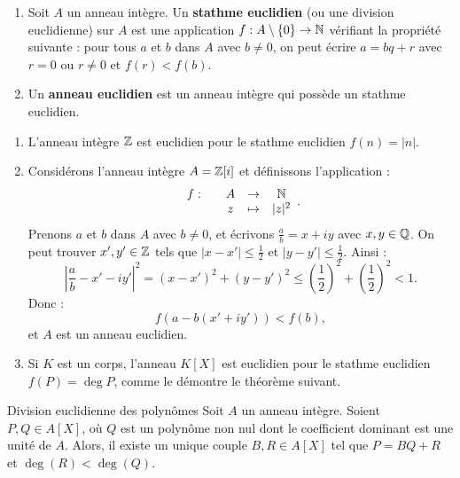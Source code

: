 \documentclass[]{report}
\begin{document}
\begin{df}{}{}
    \begin{enumerate}
        \item Soit $A$ un anneau intègre. Un \textbf{stathme euclidien} (ou une division euclidienne) sur $A$ est une application $f : A \setminus \{0\} \to \mathbb{N}$ vérifiant la propriété suivante : pour tous $a$ et $b$ dans $A$ avec $b \neq 0$, on peut écrire $a = bq + r$ avec $r = 0$ ou $r \neq 0$ et $f(r) < f(b)$.
        \item Un \textbf{anneau euclidien} est un anneau intègre qui possède un stathme euclidien.
    \end{enumerate}
\end{df}

\begin{ex}{}{}
    \begin{enumerate}
        \item L'anneau intègre $\mathbb{Z}$ est euclidien pour le stathme euclidien $f(n) = |n|$.
        \item Considérons l'anneau intègre $A = \mathbb{Z}[i]$ et définissons l'application :
        \[\begin{array}{ccccc} f : & & A & \to & \mathbb{N} \\ & & z & \mapsto & |z|^2 \end{array}.\]
        Prenons $a$ et $b$ dans $A$ avec $b \neq 0$, et écrivons $\frac{a}{b} = x + iy$ avec $x, y \in \mathbb{Q}$. On peut trouver $x', y' \in \mathbb{Z}$ tels que $|x - x'| \le \frac{1}{2}$ et $|y - y'| \le \frac{1}{2}$. Ainsi :
        \[\left| \frac{a}{b} - x' - iy' \right|^2 = (x - x')^2 + (y - y')^2 \le \left(\frac{1}{2}\right)^2 + \left(\frac{1}{2}\right)^2 < 1.\]
        Donc :
        \[f(a - b(x' + iy')) < f(b),\]
        et $A$ est un anneau euclidien.
        \item Si $K$ est un corps, l'anneau $K[X]$ est euclidien pour le stathme euclidien $f(P) = \deg P$, comme le démontre le théorème suivant.
    \end{enumerate}
\end{ex}

\begin{tm}{Division euclidienne des polynômes}{}
    Soit $A$ un anneau intègre. Soient $P, Q \in A[X]$, où $Q$ est un polynôme non nul dont le coefficient dominant est une unité de $A$. Alors, il existe un unique couple $B, R \in A[X]$ tel que $P = BQ + R$ et $\deg(R) < \deg(Q)$.
\end{tm}
\end{document}
